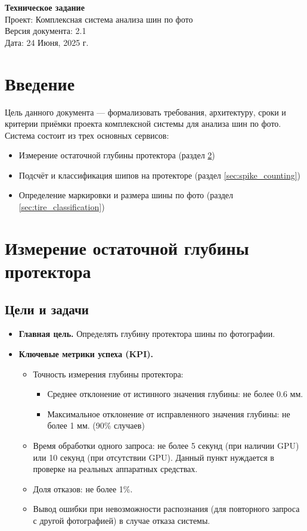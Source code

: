 \documentclass[12pt]{article}
\begin{document}
\begin{center}
	{\LARGE \textbf{Техническое задание}}\\[1em]
	{\Large Проект: Комплексная система анализа шин по фото}\\[2em]
	Версия документа: 2.1 \\
	Дата: 24 Июня, 2025 г.
\end{center}

\tableofcontents
\newpage

\section{Введение}
Цель данного документа — формализовать требования, архитектуру, сроки и критерии приёмки проекта комплексной системы для анализа шин по фото. Система состоит из трех основных сервисов:
\begin{itemize}
	\item Измерение остаточной глубины протектора (раздел \ref{sec:depth_measurement})
	\item Подсчёт и классификация шипов на протекторе (раздел \ref{sec:spike_counting})
	\item Определение маркировки и размера шины по фото (раздел \ref{sec:tire_classification})
\end{itemize}

\section{Измерение остаточной глубины протектора}
\label{sec:depth_measurement}

\subsection{Цели и задачи}
\begin{itemize}
	\item \textbf{Главная цель.} Определять глубину протектора шины по фотографии.
	\item \textbf{Ключевые метрики успеха (KPI).}
	      \begin{itemize}
		      \item Точность измерения глубины протектора:
		            \begin{itemize}
			            \item Среднее отклонение от истинного значения глубины: не более 0.6 мм.
			            \item Максимальное отклонение от исправленного значения глубины: не более 1 мм. (90\% случаев)
		            \end{itemize}
		      \item Время обработки одного запроса: не более 5 секунд (при наличии GPU) или 10 секунд (при отсутствии GPU). Данный пункт нуждается в проверке на реальных аппаратных средствах.
		      \item Доля отказов: не более 1\%.
		      \item Вывод ошибки при невозможности распознания (для повторного запроса с другой фотографией) в случае отказа системы.
	      \end{itemize}
\end{itemize}
\end{document}
